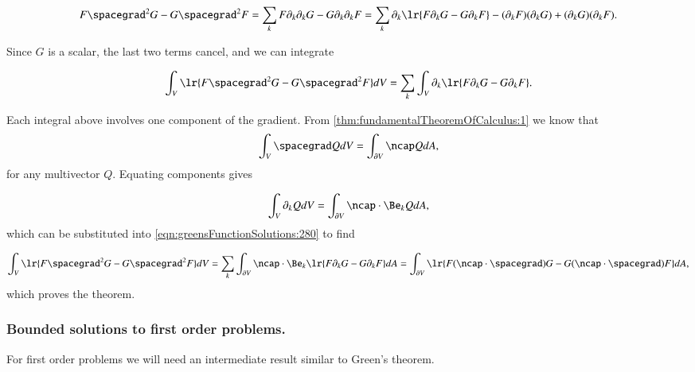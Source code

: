 \begin{dmath}\label{eqn:greensFunctionSolutions:260}
F \spacegrad^2 G - G \spacegrad^2 F
=
\sum_k F \partial_k \partial_k G - G \partial_k \partial_k F
=
\sum_k \partial_k \lr{
F \partial_k G - G \partial_k F
}
-
(\partial_k F)(\partial_k G) + (\partial_k G)(\partial_k F).
\end{dmath}

Since \( G \) is a scalar, the last two terms cancel, and we can integrate

\begin{dmath}\label{eqn:greensFunctionSolutions:280}
\int_V \lr{ F \spacegrad^2 G - G \spacegrad^2 F } dV
=
\sum_k \int_V \partial_k \lr{ F \partial_k G - G \partial_k F }.
\end{dmath}

Each integral above involves one component of the gradient.
From
\cref{thm:fundamentalTheoremOfCalculus:1}
we know that
\begin{dmath}\label{eqn:greensFunctionSolutions:300}
\int_V \spacegrad Q dV = \int_{\partial V} \ncap Q dA,
\end{dmath}
for any multivector \( Q \).
Equating components gives

\begin{dmath}\label{eqn:greensFunctionSolutions:460}
\int_V \partial_k Q dV = \int_{\partial V} \ncap \cdot \Be_k Q dA,
\end{dmath}
which can be substituted into \cref{eqn:greensFunctionSolutions:280} to find

\begin{dmath}\label{eqn:greensFunctionSolutions:480}
\int_V \lr{ F \spacegrad^2 G - G \spacegrad^2 F } dV
=
\sum_k \int_{\partial V} \ncap \cdot \Be_k \lr{ F \partial_k G - G \partial_k F } dA
=
\int_{\partial V} \lr{ F (\ncap \cdot \spacegrad) G - G (\ncap \cdot \spacegrad) F } dA,
\end{dmath}
which proves the theorem.

\subsubsection{Bounded solutions to first order problems.}

For first order problems we will need an intermediate result similar to Green's theorem.


